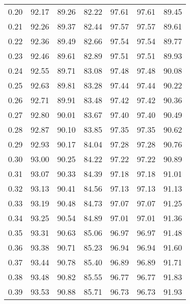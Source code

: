 \begin{tabular}{|c|c|c|c|c|c|c|}
      0.20 &     92.17 &     89.26 &      82.22 &   97.61 &      97.61 &         89.45 \\
      0.21 &     92.26 &     89.37 &      82.44 &   97.57 &      97.57 &         89.61 \\
      0.22 &     92.36 &     89.49 &      82.66 &   97.54 &      97.54 &         89.77 \\
      0.23 &     92.46 &     89.61 &      82.89 &   97.51 &      97.51 &         89.93 \\
      0.24 &     92.55 &     89.71 &      83.08 &   97.48 &      97.48 &         90.08 \\
      0.25 &     92.63 &     89.81 &      83.28 &   97.44 &      97.44 &         90.22 \\
      0.26 &     92.71 &     89.91 &      83.48 &   97.42 &      97.42 &         90.36 \\
      0.27 &     92.80 &     90.01 &      83.67 &   97.40 &      97.40 &         90.49 \\
      0.28 &     92.87 &     90.10 &      83.85 &   97.35 &      97.35 &         90.62 \\
      0.29 &     92.93 &     90.17 &      84.04 &   97.28 &      97.28 &         90.76 \\
      0.30 &     93.00 &     90.25 &      84.22 &   97.22 &      97.22 &         90.89 \\
      0.31 &     93.07 &     90.33 &      84.39 &   97.18 &      97.18 &         91.01 \\
      0.32 &     93.13 &     90.41 &      84.56 &   97.13 &      97.13 &         91.13 \\
      0.33 &     93.19 &     90.48 &      84.73 &   97.07 &      97.07 &         91.25 \\
      0.34 &     93.25 &     90.54 &      84.89 &   97.01 &      97.01 &         91.36 \\
      0.35 &     93.31 &     90.63 &      85.06 &   96.97 &      96.97 &         91.48 \\
      0.36 &     93.38 &     90.71 &      85.23 &   96.94 &      96.94 &         91.60 \\
      0.37 &     93.44 &     90.78 &      85.40 &   96.89 &      96.89 &         91.71 \\
      0.38 &     93.48 &     90.82 &      85.55 &   96.77 &      96.77 &         91.83 \\
      0.39 &     93.53 &     90.88 &      85.71 &   96.73 &      96.73 &         91.93 \\

\end{tabular}
